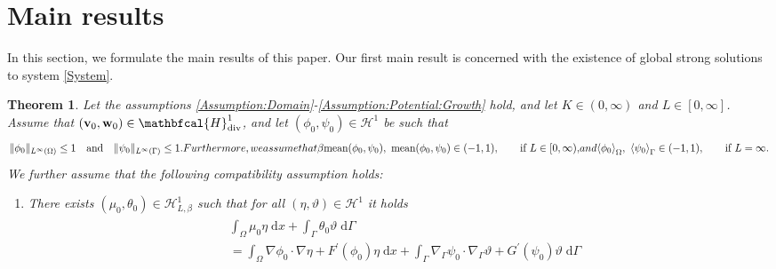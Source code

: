 \documentclass[10pt,reqno]{amsart}
\newtheorem{theorem}{Theorem}[section]
\theoremstyle{remark}
\numberwithin{equation}{section}
\newcommand{\norm}[1]{\| #1 \|}
\newcommand{\scp}[2]{ ( #1 , #2  )}
\newcommand{\meano}[1]{{\langle #1 \rangle}_{\Omega}}
\newcommand{\meang}[1]{{\langle #1 \rangle}_{\Gamma}}
\newcommand{\mean}[2]{\textnormal{mean}\scp{#1}{#2}}
\newcommand{\bv}{\mathbf{v}}
\newcommand{\bw}{\mathbf{w}}
\newcommand{\intO}{\int_\Omega}
\newcommand{\intG}{\int_\Gamma}
\newcommand{\dx}{\;\mathrm{d}x}
\newcommand{\dG}{\;\mathrm d\Ga}
\newcommand{\Grad}{\nabla}
\newcommand{\Div}{\textnormal{div}}
\newcommand{\Gradg}{\nabla_\Ga}
\newcommand{\Om}{\Omega}
\newcommand{\Ga}{\Gamma}
\begin{document}
\medskip

\section{Main results}
\label{Section:MainResults}

In this section, we formulate the main results of this paper. Our first main result is concerned with the existence of global strong solutions to system \eqref{System}.
\begin{theorem}\label{Theorem:GlobalExistence}
        Let the assumptions \ref{Assumption:Domain}-\ref{Assumption:Potential:Growth} hold, and let $K\in(0,\infty)$ and $L\in[0,\infty]$. Assume that $(\bv_0,\bw_0)\in\mathbfcal{H}^1_\Div$, and let $(\phi_0,\psi_0)\in\mathcal{H}^1$ be such that
        \begin{subequations}\label{Assumption:InitialCondition}
        	\begin{align}\label{Assumption:InitalCondition:Int}
            	\norm{\phi_0}_{L^\infty(\Om)} \leq 1 \quad\text{and}\quad \norm{\psi_0}_{L^\infty(\Ga)} \leq 1.
        	\end{align}
        	Furthermore, we assume that
        	\begin{align}\label{Assumption:InitalCondition:L}
            	\beta\mean{\phi_0}{\psi_0},\ \mean{\phi_0}{\psi_0}\in(-1,1), \qquad\text{if~}L\in[0,\infty),
        	\end{align}
        	and
        	\begin{align}\label{Assumption:InitalCondition:Inf}
            	\meano{\phi_0}, \ \meang{\psi_0}\in(-1,1), \qquad\text{if~} L = \infty.
        	\end{align}
        \end{subequations}
        We further assume that the following compatibility assumption holds:
        \begin{enumerate}[label=\textnormal{\bfseries(C)},topsep=0ex,leftmargin=*]
        \item \label{cond:MT:0} There exists $\scp{\mu_0}{\theta_0}\in\mathcal{H}^1_{L,\beta}$ such that for all $\scp{\eta}{\vartheta}\in\mathcal{H}^1$ it holds
        \begin{align*}
        \begin{aligned}
            &\intO\mu_0\eta\dx + \intG\theta_0\vartheta\dG 
            \\
            &= \intO\Grad\phi_0\cdot\Grad\eta + F^\prime(\phi_0)\eta\dx + \intG\Gradg\psi_0\cdot\Gradg\vartheta + G^\prime(\psi_0)\vartheta\dG 
            \\

\end{aligned}
\end{align*}
\end{enumerate}
\end{theorem}
\end{document}

